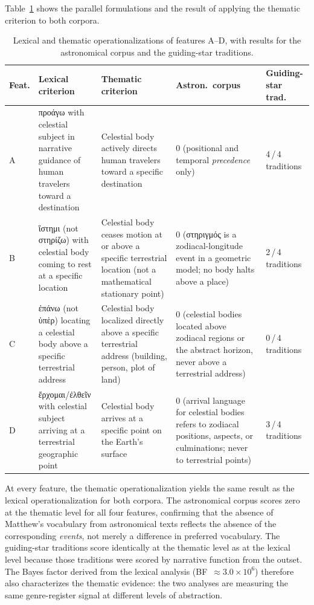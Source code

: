 \documentclass[11pt,a4paper]{article}
\newcommand{\grk}[1]{{\fontencoding{LGR}\selectfont #1}}
\newcommand{\grk}[1]{{\greekfont #1}}
\begin{document}
Table~\ref{tab:thematic} shows the parallel formulations and the result of
applying the thematic criterion to both corpora.

\begin{table}[h]
  \caption{Lexical and thematic operationalizations of features A--D, with
    results for the astronomical corpus and the guiding-star traditions.}
  \label{tab:thematic}
  \centering
  \small
  \begin{tabular}{@{}p{0.5cm}p{3.8cm}p{3.8cm}p{2.2cm}p{2.2cm}@{}}
    \toprule
    Feat. & Lexical criterion & Thematic criterion &
      Astron.\ corpus & Guiding-star trad. \\
    \midrule
    A & \grk{προάγω} with celestial subject in narrative guidance of
        human travelers toward a destination &
      Celestial body actively directs human travelers toward a specific
        destination &
      0 (positional and temporal \emph{precedence} only) &
      4\,/\,4 traditions \\[4pt]
    B & \grk{ἵστημι} (not \grk{στηρίζω}) with celestial body coming to
        rest at a specific location &
      Celestial body ceases motion at or above a specific terrestrial
        location (not a mathematical stationary point) &
      0 (\grk{στηριγμός} is a zodiacal-longitude event in a geometric
        model; no body halts above a place) &
      2\,/\,4 traditions \\[4pt]
    C & \grk{ἐπάνω} (not \grk{ὑπὲρ}) locating a celestial body above
        a specific terrestrial address &
      Celestial body localized directly above a specific terrestrial
        address (building, person, plot of land) &
      0 (celestial bodies located above zodiacal regions or the abstract
        horizon, never above a terrestrial address) &
      0\,/\,4 traditions \\[4pt]
    D & \grk{ἔρχομαι}/\grk{ἐλθεῖν} with celestial subject arriving at
        a terrestrial geographic point &
      Celestial body arrives at a specific point on the Earth's surface &
      0 (arrival language for celestial bodies refers to zodiacal
        positions, aspects, or culminations; never to terrestrial points) &
      3\,/\,4 traditions \\
    \bottomrule
  \end{tabular}
  \smallskip\par
  {\small At every feature, the thematic operationalization yields the same
  result as the lexical operationalization for both corpora. The astronomical
  corpus scores zero at the thematic level for all four features, confirming
  that the absence of Matthew's vocabulary from astronomical texts reflects the
  absence of the corresponding \emph{events}, not merely a difference in
  preferred vocabulary. The guiding-star traditions score identically at the
  thematic level as at the lexical level because those traditions were scored
  by narrative function from the outset. The Bayes factor derived from the
  lexical analysis (BF~$\approx 3.0\times10^{6}$) therefore also characterizes the
  thematic evidence: the two analyses are measuring the same genre-register
  signal at different levels of abstraction.}
\end{table}
\end{document}
